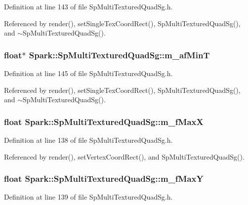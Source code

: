 Definition at line 143 of file Sp\-Multi\-Textured\-Quad\-Sg.h.

Referenced by render(), set\-Single\-Tex\-Coord\-Rect(), Sp\-Multi\-Textured\-Quad\-Sg(), and $\sim$Sp\-Multi\-Textured\-Quad\-Sg().
\subsubsection{\setlength{\rightskip}{0pt plus 5cm}float$\ast$ {\bf Spark::Sp\-Multi\-Textured\-Quad\-Sg::m\_\-af\-Min\-T}\hspace{0.3cm}{\tt  [protected]}}\label{classSpark_1_1SpMultiTexturedQuadSg_p8}


Definition at line 145 of file Sp\-Multi\-Textured\-Quad\-Sg.h.

Referenced by render(), set\-Single\-Tex\-Coord\-Rect(), Sp\-Multi\-Textured\-Quad\-Sg(), and $\sim$Sp\-Multi\-Textured\-Quad\-Sg().
\subsubsection{\setlength{\rightskip}{0pt plus 5cm}float {\bf Spark::Sp\-Multi\-Textured\-Quad\-Sg::m\_\-f\-Max\-X}\hspace{0.3cm}{\tt  [protected]}}\label{classSpark_1_1SpMultiTexturedQuadSg_p3}


Definition at line 138 of file Sp\-Multi\-Textured\-Quad\-Sg.h.

Referenced by render(), set\-Vertex\-Coord\-Rect(), and Sp\-Multi\-Textured\-Quad\-Sg().
\subsubsection{\setlength{\rightskip}{0pt plus 5cm}float {\bf Spark::Sp\-Multi\-Textured\-Quad\-Sg::m\_\-f\-Max\-Y}\hspace{0.3cm}{\tt  [protected]}}\label{classSpark_1_1SpMultiTexturedQuadSg_p4}


Definition at line 139 of file Sp\-Multi\-Textured\-Quad\-Sg.h.

